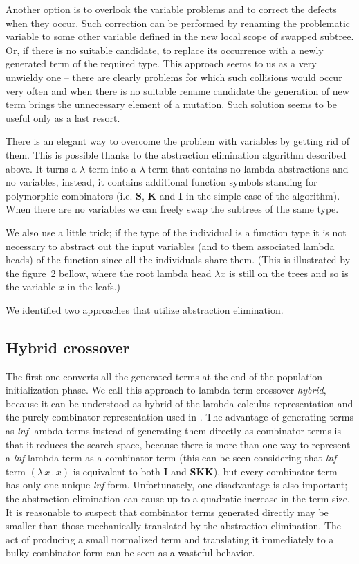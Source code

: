 \documentclass{sig-alternate}
\newcommand{\lterm}{$\lambda$-term\xspace}
\newcommand{\lamb}[2]{( \lambda \, #1 \, . \, #2 )}
\newcommand{\Scomb }{\mathbf{S}}
\newcommand{\Kcomb }{\mathbf{K}}
\newcommand{\Icomb }{\mathbf{I}}
\newcommand{\lnf}{\textit{lnf}\xspace}
\begin{document}
Another option is to overlook the variable problems and to correct the
defects when they occur. Such correction can be performed by 
renaming the problematic variable to some other variable defined in the new local scope of swapped subtree. Or, if there is no suitable candidate, to replace its occurrence with a newly generated term of the required type. This approach seems to us as a very unwieldy one -- there are clearly problems for which such collisions would
occur very often and when there is no suitable rename candidate the 
generation of new term brings the unnecessary element of a mutation.
Such solution seems to be useful only as a last resort.

There is an elegant way to overcome the problem with variables by getting rid of them.
This is possible thanks to the abstraction elimination algorithm described above.
It turns a \lterm into a \lterm that contains no lambda abstractions
and no variables, instead, it contains additional function symbols standing for 
polymorphic combinators (i.e. $\Scomb$, $\Kcomb$ and $\Icomb$ 
in the simple case of the algorithm). When there are no variables
we can freely swap the subtrees of the same type.

We also use a little trick; if the type of the individual is a function type it is not necessary to abstract out the input variables (and to them associated lambda heads) of the function since all the individuals share them. (This is illustrated by the figure~2 bellow, where the root lambda head $\lambda x$ is still on the trees and so is the variable $x$ in the leafs.)   

We identified two approaches that utilize abstraction elimination.

\subsection{Hybrid crossover}

The first one converts all the generated terms at the end of the population initialization phase. We call this approach to lambda term crossover 
\textit{hybrid}, because it can be understood as hybrid of the
lambda calculus representation and the purely combinator representation
used in \cite{kes}. The advantage of generating terms as \lnf lambda terms instead of generating them directly as combinator terms is that it reduces the search space, because there is more than one way to represent a \lnf lambda term as a combinator term (this can be seen considering that \lnf term $\lamb{x}{x}$ is equivalent to both $\Icomb$ and $\Scomb \Kcomb \Kcomb$), but every combinator term has only one unique \lnf form. Unfortunately, one disadvantage is also important;
the abstraction elimination can cause up to a quadratic 
increase in the term size. It is reasonable to suspect that combinator
terms generated directly may be smaller than those mechanically
translated by the abstraction elimination. 
The act of producing a small normalized term and translating it
immediately to a bulky combinator form can be seen as a wasteful behavior.
\end{document}
